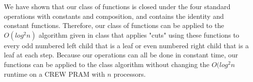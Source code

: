 \documentclass[letterpaper,notitlepage,twoside]{article}
\begin{document}
We have shown that our class of functions is closed under the four standard operations with constants and composition, and contains the identity and constant functions. Therefore, our class of functions can be applied to the $O(log^2n)$ algorithm given in class that applies "cuts" using these functions to every odd numbered left child that is a leaf or even numbered right child that is a leaf at each step. Because our operations can all be done in constant time, our functions can be applied to the class algorithm without changing the $O(log^2n$ runtime on a CREW PRAM with $n$ processors.
\end{document}
